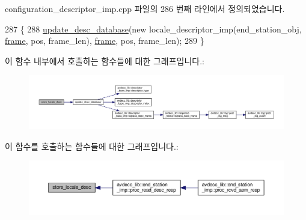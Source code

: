 configuration\+\_\+descriptor\+\_\+imp.\+cpp 파일의 286 번째 라인에서 정의되었습니다.


\begin{DoxyCode}
287 \{
288     \hyperlink{classavdecc__lib_1_1configuration__descriptor__imp_a98445251711b644b6da09d2354003778}{update\_desc\_database}(\textcolor{keyword}{new} locale\_descriptor\_imp(end\_station\_obj, 
      \hyperlink{gst__avb__playbin_8c_ac8e710e0b5e994c0545d75d69868c6f0}{frame}, pos, frame\_len), \hyperlink{gst__avb__playbin_8c_ac8e710e0b5e994c0545d75d69868c6f0}{frame}, pos, frame\_len);
289 \}
\end{DoxyCode}


이 함수 내부에서 호출하는 함수들에 대한 그래프입니다.\+:
\nopagebreak
\begin{figure}[H]
\begin{center}
\leavevmode
\includegraphics[width=350pt]{classavdecc__lib_1_1configuration__descriptor__imp_a7b7b25bcd5ee45166b328935ee93abb3_cgraph}
\end{center}
\end{figure}




이 함수를 호출하는 함수들에 대한 그래프입니다.\+:
\nopagebreak
\begin{figure}[H]
\begin{center}
\leavevmode
\includegraphics[width=350pt]{classavdecc__lib_1_1configuration__descriptor__imp_a7b7b25bcd5ee45166b328935ee93abb3_icgraph}
\end{center}
\end{figure}


